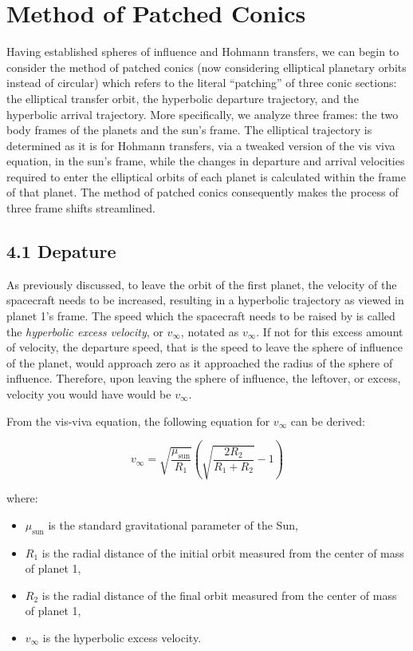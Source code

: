 \documentclass{article}
\numberwithin{figure}{section}
\begin{document}
\section{Method of Patched Conics}
Having established spheres of influence and Hohmann transfers, we can begin to consider the method of patched conics (now considering elliptical planetary orbits instead of circular) which refers to the literal “patching” of three conic sections: the elliptical transfer orbit, the hyperbolic departure trajectory, and the hyperbolic arrival trajectory. More specifically, we analyze three frames: the two body frames of the planets and the sun’s frame. The elliptical trajectory is determined as it is for Hohmann transfers, via a tweaked version of the vis viva equation, in the sun’s frame, while the changes in departure and arrival velocities required to enter the elliptical orbits of each planet is calculated within the frame of that planet. The method of patched conics consequently makes the process of three frame shifts streamlined.

\subsection*{4.1 Depature}
As previously discussed, to leave the orbit of the first planet, the velocity of the spacecraft needs to be increased, resulting in a hyperbolic trajectory as viewed in planet 1’s frame. The speed which the spacecraft needs to be raised by is called the \textit{hyperbolic excess velocity}, or \(v_\infty\), notated as \(v_\infty\). If not for this excess amount of velocity, the departure speed, that is the speed to leave the sphere of influence of the planet, would approach zero as it approached the radius of the sphere of influence. Therefore, upon leaving the sphere of influence, the leftover, or excess, velocity you would have would be \(v_\infty\).

From the vis-viva equation, the following equation for \(v_\infty\) can be derived:

\[
v_\infty = \sqrt{\frac{\mu_{\text{sun}}}{R_1}} \left( \sqrt{\frac{2 R_2}{R_1 + R_2}} - 1 \right)
\]

where:
\begin{itemize}
    \item \(\mu_{\text{sun}}\) is the standard gravitational parameter of the Sun,
    \item \(R_1\) is the radial distance of the initial orbit measured from the center of mass of planet 1,
    \item \(R_2\) is the radial distance of the final orbit measured from the center of mass of planet 1,
    \item \(v_\infty\) is the hyperbolic excess velocity.
\end{itemize}
\end{document}
